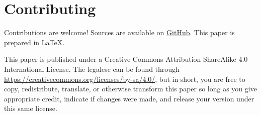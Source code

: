 \documentclass[fontsize=10pt, oneside]{scrartcl}
\begin{document}
\section{Contributing}

Contributions are welcome!
Sources are available on
\href{https://github.com/sysprog21/concurrency-primer}{GitHub}.
This paper is prepared in \LaTeX{}.

This paper is published under a
Creative Commons Attribution-ShareAlike 4.0 International License.
The legalese can be found through
\url{https://creativecommons.org/licenses/by-sa/4.0/},
but in short,
you are free to copy, redistribute, translate, or otherwise transform this paper
so long as you give appropriate credit, indicate if changes were made,
and release your version under this same license.
\end{document}
